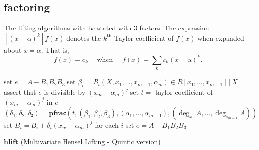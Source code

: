 \documentclass[11pt,reqno]{amsart}
\numberwithin{equation}{section}
\newcommand{\op}[1]  { \operatorname{ #1 }}
\begin{document}
\subsection{factoring}

The lifting algorithms with be stated with $3$ factors. The expression
$[(x-\alpha)^k] f(x)$ denotes the $k^{\text{th}}$ Taylor coefficient of $f(x)$
when expanded about $x=\alpha$. That is,
\begin{equation*}
[(x-\alpha)^k] f(x) = c_k \quad \text{ when } \quad f(x) = \sum_{k} c_k
(x-\alpha)^k\text{.}
\end{equation*}


\begin{algorithm}[H]
\DontPrintSemicolon
{}

set $e = A - B_1 B_2 B_3$ 
set $\beta_i = B_i(X, x_1, \dots, x_{m-1}, \alpha_m) \in R[x_1, \dots,
x_{m-1}][X]$\;
\For{$j=1$ \KwTo $\op{deg}_{x_m}(A)$}
{
	assert that $e$ is divisible by $(x_m - \alpha_m)^j$\;
	set $t =$ taylor coefficient of $(x_m - \alpha_m)^j$ in $e$ 
	$(\delta_1, \delta_2, \delta_3) = \textbf{pfrac}(t, (\beta_1, \beta_2,
\beta_3),(\alpha_1, \dots,\alpha_{m-1}), (\op{deg}_{x_1}A, \dots,
\op{deg}_{x_{m-1}}A))$ \;
	set $B_i = B_i + \delta_i (x_m - \alpha_m)^j$ for each $i$\;
	set $e = A - B_1 B_2 B_3$
}
{
}
\caption{$\textbf{hlift}$ (Multivariate Hensel Lifting - Quintic version)}
\label{algo_mlift}
\end{algorithm}
\end{document}

